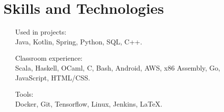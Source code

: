 \documentclass[10pt]{article}
\begin{document}
\section*{Skills and Technologies}
\begin{itemize}[font=\bfseries,  wide=1.5em,  leftmargin=*]
  \item[Used in projects:] \  \\ Java, Kotlin, Spring, Python, SQL, C++.
  \item[Classroom experience:] \ \\ Scala, Haskell, OCaml, C, Bash, Android, AWS, x86 Assembly, Go, JavaScript, HTML/CSS.
  \item[Tools:] \ \\ Docker, Git, Tensorflow, Linux, Jenkins, \LaTeX.
\end{itemize}
\end{document}

